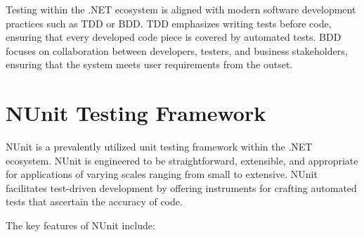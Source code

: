 Testing within the .NET ecosystem is aligned with modern software development practices such as \acf{TDD} or \acf{BDD}. \ac{TDD} emphasizes writing tests before code, ensuring that every developed code piece is covered by automated tests. \ac{BDD} focuses on collaboration between developers, testers, and business stakeholders, ensuring that the system meets user requirements from the outset.

\section{NUnit Testing Framework}

NUnit is a prevalently utilized unit testing framework within the .NET ecosystem. NUnit is engineered to be straightforward, extensible, and appropriate for applications of varying scales ranging from small to extensive. NUnit facilitates test-driven development by offering instruments for crafting automated tests that ascertain the accuracy of code.

The key features of NUnit include:

